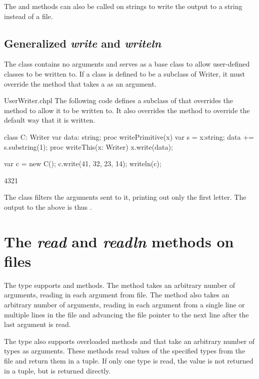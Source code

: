 The  and  methods can also be called on
strings to write the output to a string instead of a file.

\subsection{Generalized {\em write} and {\em writeln}}
\label{writer}

The  class contains no arguments and serves as a base
class to allow user-defined classes to be written to.  If a class is
defined to be a subclass of Writer, it must override
the  method that takes a  as an argument.

\begin{chapelexample}{UserWriter.chpl}
The following code defines a subclass of  that overrides
the  method to allow it to be written to.  It also
overrides the  method to override the default way that
it is written.
\begin{chapel}
class C: Writer {
  var data: string;
  proc writePrimitive(x) {
    var s = x:string;
    data += s.substring(1);
  }
  proc writeThis(x: Writer) {
    x.write(data);
  }
}

var c = new C();
c.write(41, 32, 23, 14);
writeln(c);
\end{chapel}
\begin{chapelprintoutput}
4321
\end{chapelprintoutput}
The  class filters the arguments sent to it, printing out only
the first letter.  The output to the above is thus .
\end{chapelexample}


\section{The {\em read} and {\em readln} methods on files}
\label{fileread}

The  type supports  and  methods.
The  method takes an arbitrary number of arguments, reading
in each argument from file.  The  method also
takes an arbitrary number of arguments, reading in each argument
from a single line or multiple lines in the file and 
advancing the file pointer to the next line after the last argument 
is read.

The  type also supports overloaded methods 
and  that take an arbitrary number of types as arguments.
These methods read values of the specified types from the file and
return them in a tuple.  If only one type is read, the value is not
returned in a tuple, but is returned directly.

